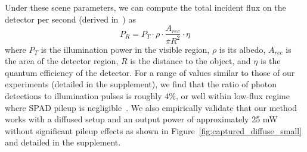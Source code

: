 Under these scene parameters, we can compute the total incident
flux on the detector per second (derived in~\cite{mcmanamon2012ladar}) as
\begin{equation}
  P_R = P_T \cdot \rho \cdot \frac{A_{rec}}{\pi R^2} \cdot \eta
\end{equation}
where $P_T$ is the illumination power in the visible region, $\rho$ is its
albedo, $A_{rec}$ is the area of the detector region, $R$ is the distance to the
object, and $\eta$ is the quantum efficiency of the detector. For a range of
values similar to those of our experiments (detailed in the supplement), we find
that the ratio of photon detections to illumination pulses is roughly 4\%, or
well within low-flux regime where SPAD pileup is negligible~\cite{oconnortcspc}.
We also empirically validate that our method works with a diffused setup and
an output power of approximately 25 mW without significant pileup effects as
shown in Figure~\ref{fig:captured_diffuse_small} and detailed in the supplement.






